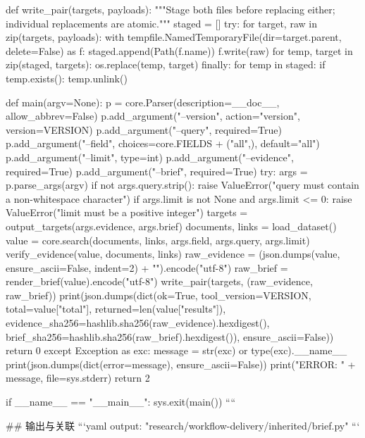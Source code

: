 def write_pair(targets, payloads):
    """Stage both files before replacing either; individual replacements are atomic."""
    staged = []
    try:
        for target, raw in zip(targets, payloads):
            with tempfile.NamedTemporaryFile(dir=target.parent, delete=False) as f:
                staged.append(Path(f.name))
                f.write(raw)
        for temp, target in zip(staged, targets):
            os.replace(temp, target)
    finally:
        for temp in staged:
            if temp.exists():
                temp.unlink()


def main(argv=None):
    p = core.Parser(description=__doc__, allow_abbrev=False)
    p.add_argument("--version", action="version", version=VERSION)
    p.add_argument("--query", required=True)
    p.add_argument("--field", choices=core.FIELDS + ("all",), default="all")
    p.add_argument("--limit", type=int)
    p.add_argument("--evidence", required=True)
    p.add_argument("--brief", required=True)
    try:
        args = p.parse_args(argv)
        if not args.query.strip():
            raise ValueError("query must contain a non-whitespace character")
        if args.limit is not None and args.limit <= 0:
            raise ValueError("limit must be a positive integer")
        targets = output_targets(args.evidence, args.brief)
        documents, links = load_dataset()
        value = core.search(documents, links, args.field, args.query, args.limit)
        verify_evidence(value, documents, links)
        raw_evidence = (json.dumps(value, ensure_ascii=False, indent=2) + "\n").encode("utf-8")
        raw_brief = render_brief(value).encode("utf-8")
        write_pair(targets, (raw_evidence, raw_brief))
        print(json.dumps(dict(ok=True, tool_version=VERSION, total=value["total"],
                              returned=len(value["results"]),
                              evidence_sha256=hashlib.sha256(raw_evidence).hexdigest(),
                              brief_sha256=hashlib.sha256(raw_brief).hexdigest()), ensure_ascii=False))
        return 0
    except Exception as exc:
        message = str(exc) or type(exc).__name__
        print(json.dumps(dict(error=message), ensure_ascii=False))
        print("ERROR: " + message, file=sys.stderr)
        return 2


if __name__ == "__main__":
    sys.exit(main())
````

## 输出与关联
```yaml
output: "research/workflow-delivery/inherited/brief.py"
```
